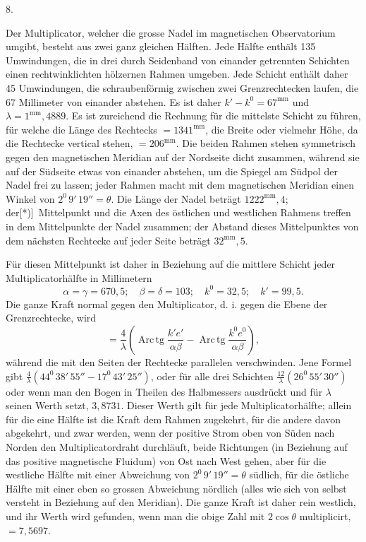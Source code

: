\clearpage\begingroup
{}
\begin{center}8.\end{center}
\noindent\hspace*{\parindent}Der Multiplicator, welcher die grosse Nadel im magnetischen Observatorium umgibt, besteht aus zwei ganz gleichen Hälften. Jede Hälfte enthält 135 Umwindungen, die in drei durch Seidenband von einander getrennten Schichten einen rechtwinklichten hölzernen Rahmen umgeben. Jede Schicht enthält daher 45 Umwindungen, die schraubenförmig zwischen zwei Grenzrechtecken laufen, die 67 Millimeter von einander abstehen. Es ist daher $k'-k^0=67^{\mathrm{mm}}$ und $\lambda=1^{\mathrm{mm}}{,}4889$. Es ist zureichend die Rechnung für die mittelste Schicht zu führen, für welche die Länge des Rechtecks $=1341^{\mathrm{mm}}$, die Breite oder vielmehr Höhe, da die Rechtecke vertical stehen, $=206^{\mathrm{mm}}$. Die beiden Rahmen stehen symmetrisch gegen den magnetischen Meridian auf der Nordseite dicht zusammen, während sie auf der Südseite etwas von einander abstehen, um die Spiegel am Südpol der Nadel frei zu lassen; jeder Rahmen macht mit dem magnetischen Meridian einen Winkel von $2^0\,9'\,19''=\theta$. Die Länge der Nadel beträgt $1222^{\mathrm{mm}}{,}4$; der[*)]\begingroup\renewcommand{\thefootnote}{}\endgroup\ Mittelpunkt und die Axen des östlichen und westlichen Rahmens treffen in dem Mittelpunkte der Nadel zusammen; der Abstand dieses Mittelpunktes von dem nächsten Rechtecke auf jeder Seite beträgt $32^{\mathrm{mm}}{,}5$.

Für diesen Mittelpunkt ist daher in Beziehung auf die mittlere Schicht jeder Multiplicatorhälfte in Millimetern
\[
\alpha=\gamma=670{,}5;\quad\beta=\delta=103;\quad k^0=32{,}5;\quad k'=99{,}5.
\]
\clearpage{}
\noindent Die ganze Kraft normal gegen den Multiplicator, d. i. gegen die Ebene der Grenzrechtecke, wird
\[
=\frac{4}{\lambda}\left(\operatorname{Arc\,tg}\frac{k'e'}{\alpha\beta}-\operatorname{Arc\,tg}\frac{k^0e^0}{\alpha\beta}\right),
\]
\noindent während die mit den Seiten der Rechtecke parallelen verschwinden. Jene Formel gibt $\frac{4}{\lambda}(44^0\,38'\,55''-17^0\,43'\,25'')$, oder für alle drei Schichten $\frac{12}{\lambda}(26^0\,55'\,30'')$ oder wenn man den Bogen in Theilen des Halbmessers ausdrückt und für $\lambda$ seinen Werth setzt, $3{,}8731$. Dieser Werth gilt für jede Multiplicatorhälfte; allein für die eine Hälfte ist die Kraft dem Rahmen zugekehrt, für die andere davon abgekehrt, und zwar werden, wenn der positive Strom oben von Süden nach Norden den Multiplicatordraht durchläuft, beide Richtungen (in Beziehung auf das positive magnetische Fluidum) von Ost nach West gehen, aber für die westliche Hälfte mit einer Abweichung von $2^0\,9'\,19''=\theta$ südlich, für die östliche Hälfte mit einer eben so grossen Abweichung nördlich (alles wie sich von selbst versteht in Beziehung auf den  Meridian). Die ganze Kraft ist daher rein westlich, und ihr Werth wird gefunden, wenn man die obige Zahl mit $2\cos\theta$ multiplicirt, $=7{,}5697$.

